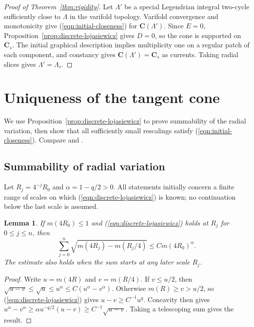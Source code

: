\documentclass[11pt,a4paper]{article}
\numberwithin{equation}{section}
\newtheorem{lemma}[theorem]{Lemma}
\theoremstyle{definition}
\theoremstyle{remark}
\begin{document}
	\begin{proof}[Proof of Theorem~\ref{thm:rigidity}]
		Let $\Lambda'$ be a special Legendrian integral two-cycle sufficiently
		close to $\Lambda$ in the varifold topology. Varifold convergence and
		monotonicity give (\ref{eqn:initial-closeness}) for $\mathbf C(\Lambda')$.
		Since $E=0$, Proposition~\ref{prop:discrete-lojasiewicz} gives $D=0$,
		so the cone is supported on $\mathbf C_s$.
		The initial graphical description implies multiplicity one on a regular
		patch of each component, and constancy gives
		$\mathbf C(\Lambda')=\mathbf C_s$ as currents. Taking radial slices
		gives $\Lambda'=\Lambda_s$.
	\end{proof}
	
	\section{Uniqueness of the tangent cone}\label{sect:uniqueness-tangent-cone}
	
	We use Proposition~\ref{prop:discrete-lojasiewicz} to prove summability
	of the radial variation, then show that all sufficiently small rescalings
	satisfy (\ref{eqn:initial-closeness}). Compare \cite[Section~1]{CM} and
	\cite[Theorem~6.7]{Sze20}.
	
	\subsection{Summability of radial variation}
	
	Let $R_j=4^{-j}R_0$ and $\alpha=1-q/2>0$. All statements initially
	concern a finite range of scales on which (\ref{eqn:discrete-lojasiewicz})
	is known; no continuation below the last scale is assumed.
	
	\begin{lemma}\label{lem:numerical}
		If $m(4R_0)\le1$ and (\ref{eqn:discrete-lojasiewicz}) holds at $R_j$ for
		$0\le j\le n$, then
		\begin{equation}\label{eqn:radial-summability}
			\sum_{j=0}^n\sqrt{m(4R_j)-m(R_j/4)}
			\le C m(4R_0)^\alpha.
		\end{equation}
		The estimate also holds when the sum starts at any later scale $R_j$.
	\end{lemma}
	
	\begin{proof}
		Write $u=m(4R)$ and $v=m(R/4)$. If $v\le u/2$, then
		$\sqrt{u-v}\le\sqrt u\le u^\alpha\le C(u^\alpha-v^\alpha)$.
		Otherwise $m(R)\ge v>u/2$, so (\ref{eqn:discrete-lojasiewicz}) gives
		$u-v\ge C^{-1}u^q$. Concavity then gives
		$u^\alpha-v^\alpha\ge\alpha u^{-q/2}(u-v)
		\ge C^{-1}\sqrt{u-v}$. Taking a telescoping sum gives the result.
	\end{proof}
	
\end{document}
